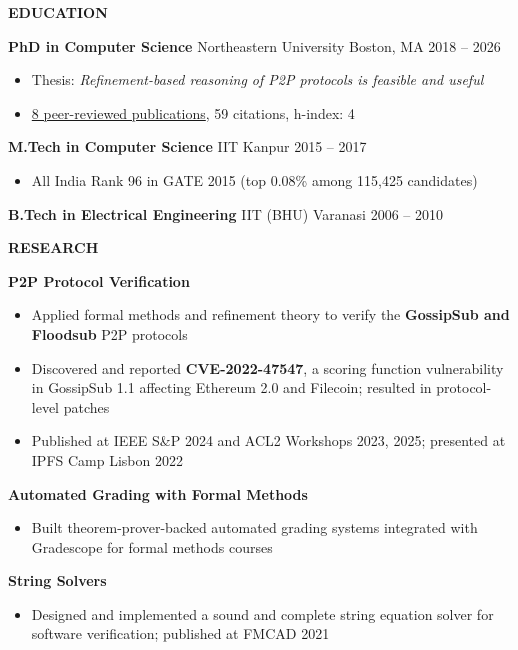 \documentclass[11pt,letterpaper]{article}
\newcommand{\cvsection}[1]{
    \vspace{0.6em} {\color{darkblue}\textbf{\Large #1}}
    \vspace{0.15em} \textcolor{lightblue}{\hrulefill}
    \vspace{0.4em} }
\begin{document}
\cvsection{EDUCATION}

\textbf{PhD in Computer Science} \textcolor{mediumgray}{\textbullet}
Northeastern University \textcolor{mediumgray}{\textbullet} Boston, MA
\textcolor{mediumgray}{\textbullet} 2018 -- 2026
\begin{itemize}
    \item Thesis: \textit{Refinement-based reasoning of P2P protocols
      is feasible and useful}
    \item \href{https://scholar.google.com/citations?user=8f9-QK4AAAAJ&hl=en}{8 peer-reviewed publications}, 59 citations, h-index: 4
\end{itemize}

\textbf{M.Tech in Computer Science}
\textcolor{mediumgray}{\textbullet} IIT Kanpur
\textcolor{mediumgray}{\textbullet} 2015 -- 2017
\begin{itemize}
    \item All India Rank 96 in GATE 2015 (top 0.08\% among 115,425
      candidates)
\end{itemize}

\textbf{B.Tech in Electrical Engineering}
\textcolor{mediumgray}{\textbullet} IIT (BHU) Varanasi
\textcolor{mediumgray}{\textbullet} 2006 -- 2010

\cvsection{RESEARCH}

\textbf{P2P Protocol Verification}
\begin{itemize}
    \item Applied formal methods and refinement theory to verify the
      \textbf{GossipSub and Floodsub} P2P protocols
    \item Discovered and reported \textbf{CVE-2022-47547}, a scoring
      function vulnerability in GossipSub 1.1 affecting Ethereum 2.0
      and Filecoin; resulted in protocol-level patches
    \item Published at IEEE S\&P 2024 and ACL2 Workshops 2023, 2025;
      presented at IPFS Camp Lisbon 2022
\end{itemize}

\textbf{Automated Grading with Formal Methods}
\begin{itemize}
    \item Built theorem-prover-backed automated grading systems
      integrated with Gradescope for formal methods courses
\end{itemize}

\textbf{String Solvers}
\begin{itemize}
    \item Designed and implemented a sound and complete string
      equation solver for software verification; published at FMCAD
      2021
\end{itemize}
\end{document}

